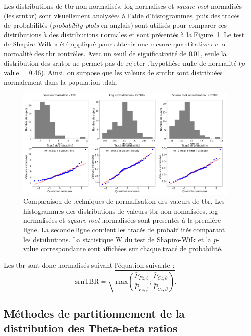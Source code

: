 Les distributions de \gls{tbr} non-normalisés, log-normalisés et \textit{square-root} normalisés (les \gls{srntbr}) sont visuellement analysées à l'aide 
d'histogrammes, puis des tracés de probabilités (\textit{probability plots} en anglais) sont utilisés pour comparer ces distributions à des distributions normales 
et sont présentés à la Figure~\ref{Figure:tbr_normalization}. Le test de Shapiro-Wilk \citep{Shapiro1965} a été appliqué pour obtenir une mesure quantitative 
de la normalité des \gls{tbr} contrôles. Avec un seuil de significativité de 0.01, seule la distribution des \gls{srntbr} ne permet pas de rejeter l'hypothèse
nulle de normalité ($p$-value = 0.46). Ainsi, on suppose que les valeurs de \gls{srntbr} sont distribuées normalement dans la population \gls{tdah}. 

\begin{figure}[h!]
  \centering
	\includegraphics[width=1.0\linewidth]{figures/chapter-4/tbr-normalization} 
  \caption{Comparaison de techniques de normalisation des valeurs de \gls{tbr}. Les histogrammes des distributions de valeurs \gls{tbr} non nomalisées,
	log normalisées et \textit{square-root} normalisées sont presentés à la première ligne. La seconde ligne contient les tracés de probabilités comparant les
	dstributions. La statistique W du test de Shapiro-Wilk et la $p$-value correspondante sont affichées sur chaque tracé de probabilité.}
  \label{Figure:tbr_normalization}
\end{figure}

Les \gls{tbr} sont donc normalisés suivant l'équation suivante :
\begin{equation}
\label{eq:tbr_srntbr_computation}
\text{srnTBR} = \sqrt{ \text{max}(\frac{\bar{P}_{Fz,\theta}}{\bar{P}_{Fz,\beta} } ; \frac{\bar{P}_{Cz,\theta}}{\bar{P}_{Cz,\beta}} ) }.
\end{equation}

\subsection{Méthodes de partitionnement de la distribution des Theta-beta ratios} \label{clustering}

